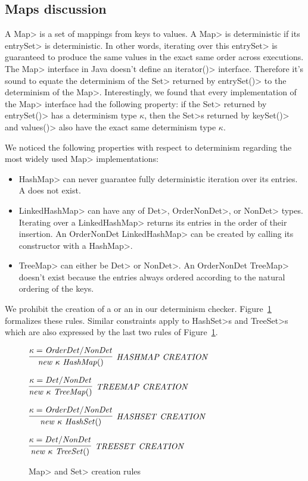 \subsection{Maps discussion}\label{maps}
A \<Map> is a set of mappings from keys to values. A \<Map> is deterministic if its \<entrySet> is deterministic.
In other words, iterating over this \<entrySet> is guaranteed to produce the same values in the exact same order across executions.
The \<Map> interface in Java doesn't define an \<iterator()> interface. Therefore it's sound to equate the determinism of the \<Set>
returned by \<entrySet()> to the determinism of the \<Map>. Interestingly, we found that every implementation of the \<Map> 
interface had the following property: if the \<Set> returned by \<entrySet()> has a determinism type $\kappa$, then
the \<Set>s returned by \<keySet()> and \<values()> also have the exact same determinism type $\kappa$.

We noticed the following properties with respect to determinism regarding the most widely used \<Map> implementations:
\begin{itemize}
    \item \<HashMap> can never guarantee fully deterministic iteration over its entries. A  does not exist.
    \item \<LinkedHashMap> can have any of \<Det>, \<OrderNonDet>, or \<NonDet> types. Iterating over a \<LinkedHashMap> returns
    its entries in the order of their insertion. An \<OrderNonDet LinkedHashMap> can be created by calling its constructor with a \<HashMap>.
    \item \<TreeMap> can either be \<Det> or \<NonDet>. An \<OrderNonDet TreeMap> doesn't exist because the entries always ordered according
    to the natural ordering of the keys. 
\end{itemize}

We prohibit the creation of a  or an  in our determinism checker.
Figure~\ref{fig-creation-rules} formalizes these rules. Similar constraints apply to \<HashSet>s and \<TreeSet>s which are
also expressed by the last two rules of Figure~\ref{fig-creation-rules}.

\begin{figure}
    $\infer[\sc{\mathit{HASHMAP \ CREATION}}]{\mathit{new \ \kappa\ HashMap()}}{\kappa = \mathit{OrderDet/NonDet}}$
    
    \bigskip
    
    $\infer[\sc{\mathit{TREEMAP \ CREATION}}]{\mathit{new \ \kappa\ TreeMap()}}{\kappa = \mathit{Det/NonDet}}$
    
    \bigskip
    
    $\infer[\sc{\mathit{HASHSET \ CREATION}}]{\mathit{new \ \kappa\ HashSet()}}{\kappa = \mathit{OrderDet/NonDet}}$
    
    \bigskip
    
    $\infer[\sc{\mathit{TREESET \ CREATION}}]{\mathit{new \ \kappa\ TreeSet()}}{\kappa = \mathit{Det/NonDet}}$
    \caption{\<Map> and \<Set> creation rules}
    \label{fig-creation-rules}
\end{figure}

